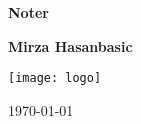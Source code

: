 \begin{titlepage}
    \begin{center}
        \vspace*{1cm}

        \Huge
        \textbf{Noter}

        \vspace{0.5cm}
        \LARGE

        \vspace{1.5cm}

        \textbf{Mirza Hasanbasic}\\

        \vspace{1.5cm}

        \vfill


        \vspace{0.8cm}

        \texttt{[image: logo]}

        \Large
        \today

    \end{center}
\end{titlepage} 